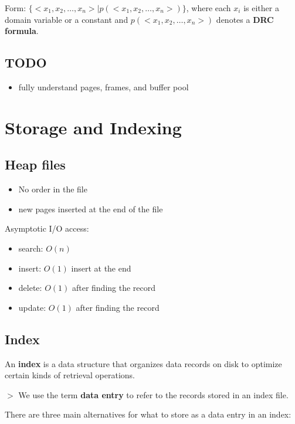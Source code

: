 \documentclass[12pt,a4paper]{article}
\newcommand{\remark}[1]{
    $>$ {\color{blue} #1}
}
\begin{document}
Form: $\{<x_1,x_2,\dots,x_n> \mid p(<x_1,x_2,\dots,x_n>)\}$, 
where each $x_i$ is either a domain variable or a constant
and $p(<x_1, x_2,\dots,x_n>)$ denotes a \textbf{DRC formula}.

\subsection*{TODO}

\begin{itemize}
    \item fully understand pages, frames, and buffer pool
\end{itemize}

\section*{Storage and Indexing}

\subsection*{Heap files}

\begin{itemize}
    \item No order in the file
    \item new pages inserted at the end of the file
\end{itemize}

Asymptotic I/O access:

\begin{itemize}
    \item search: $O(n)$
    \item insert: $O(1)$ insert at the end
    \item delete: $O(1)$ after finding the record
    \item update: $O(1)$ after finding the record
\end{itemize}

\subsection*{Index}

An \textbf{index} is a data structure that organizes data records on disk to optimize certain kinds of retrieval operations.

\remark{We use the term \textbf{data entry} to refer to the records stored in an index file.}

There are three main alternatives for what to store as a data entry in an index:
\end{document}
